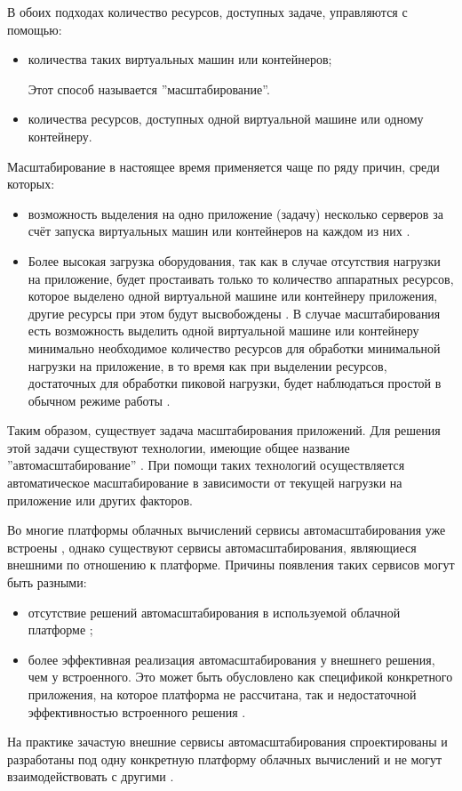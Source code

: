 В обоих подходах количество ресурсов, доступных задаче, управляются с помощью:
\begin{itemize}
    \item количества таких виртуальных машин или контейнеров;
    
    Этот способ называется ''масштабирование''.
    \item количества ресурсов, доступных одной виртуальной машине или одному контейнеру.
\end{itemize}

Масштабирование в настоящее время применяется чаще \cite{fake-24} по ряду причин, среди которых:
\begin{itemize}
    \item возможность выделения на одно приложение (задачу) несколько серверов за счёт запуска виртуальных машин или контейнеров на каждом из них \cite{fake-28}.
    \item Более высокая загрузка оборудования, так как в случае отсутствия нагрузки на приложение, будет простаивать только то количество аппаратных ресурсов, которое выделено одной виртуальной машине или контейнеру приложения, другие ресурсы при этом будут высвобождены \cite{fake-25}.
    В случае масштабирования есть возможность выделить одной виртуальной машине или контейнеру минимально необходимое количество ресурсов для обработки минимальной нагрузки на приложение, в то время как при выделении ресурсов, достаточных для обработки пиковой нагрузки, будет наблюдаться простой в обычном режиме работы \cite{fake-26}. 
\end{itemize}

Таким образом, существует задача масштабирования приложений.
Для решения этой задачи существуют технологии, имеющие общее название ''автомасштабирование'' \cite{portable-autoscaler-for-managing-multi-cloud-elasticity}.
При помощи таких технологий осуществляется автоматическое масштабирование в зависимости от текущей нагрузки на приложение или других факторов.

Во многие платформы облачных вычислений сервисы автомасштабирования уже встроены \cite{fake-32}, однако существуют сервисы автомасштабирования, являющиеся внешними по отношению к платформе.
Причины появления таких сервисов могут быть разными:
\begin{itemize}
    \item отсутствие решений автомасштабирования в используемой облачной платформе \cite{fake-27};
    \item более эффективная реализация автомасштабирования у внешнего решения, чем у встроенного.
    Это может быть обусловлено как спецификой конкретного приложения, на которое платформа не рассчитана, так и недостаточной эффективностью встроенного решения \cite{fake-29}.
\end{itemize}
На практике зачастую внешние сервисы автомасштабирования спроектированы и разработаны под одну конкретную платформу облачных вычислений и не могут взаимодействовать с другими \cite{fake-30}.

